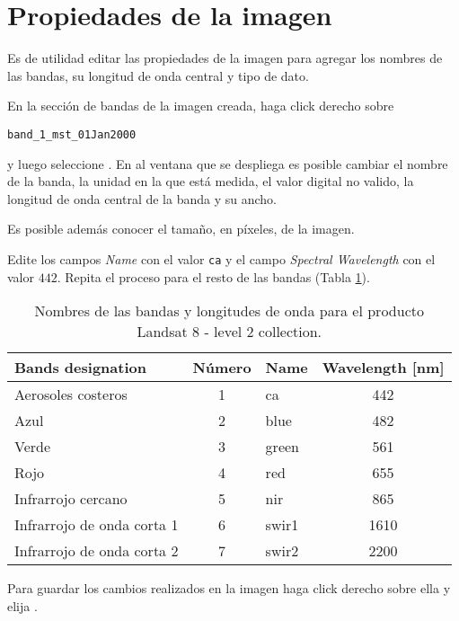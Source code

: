 \section{Propiedades de la imagen}
Es de utilidad editar las propiedades de la imagen para agregar los nombres de las bandas, su longitud de onda central y tipo de dato.

En la sección de bandas de la imagen creada, haga click derecho sobre
\begin{center}
\texttt{band\_1\_mst\_01Jan2000}
\end{center}
y luego seleccione . En al ventana que se despliega es posible cambiar el nombre de la banda, la unidad en la que está medida, el valor digital no valido, la longitud de onda central de la banda y su ancho.

Es posible además conocer el tamaño, en píxeles, de la imagen.

Edite los campos \emph{Name} con el valor \texttt{ca} y el campo \emph{Spectral Wavelength} con el valor $442$. Repita el proceso para el resto de las bandas (Tabla \ref{tab:landsat8}).

\begin{table}[h!]
  \centering
  \begin{tabular}{@{}lclc@{}}
  \toprule
  Bands designation          & Número & Name  & Wavelength {[}nm{]} \\ \midrule
  Aerosoles costeros         & 1      & ca    & 442                 \\
  Azul                       & 2      & blue  & 482                 \\
  Verde                      & 3      & green & 561                 \\
  Rojo                       & 4      & red   & 655                 \\
  Infrarrojo cercano         & 5      & nir   & 865                 \\
  Infrarrojo de onda corta 1 & 6      & swir1 & 1610                \\
  Infrarrojo de onda corta 2 & 7      & swir2 & 2200                \\ \bottomrule
  \end{tabular}
\caption{Nombres de las bandas y longitudes de onda para el producto Landsat 8 - level 2 collection.}
\label{tab:landsat8}
\end{table}

Para guardar los cambios realizados en la imagen haga click derecho sobre ella y elija .

